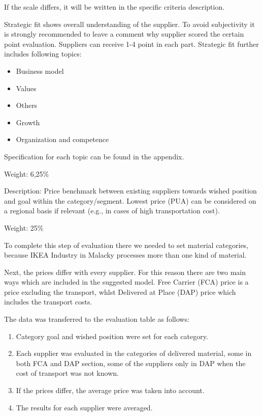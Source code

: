 \documentclass[oneside,12pt]{article}%
\begin{document}
If the scale differs, it will be written in the specific criteria description.

Strategic fit shows overall understanding of the supplier. To avoid subjectivity it is strongly recommended to leave a comment why supplier scored the certain point evaluation. Suppliers can receive 1-4 point in each part. Strategic fit further includes following topics:
\begin{itemize}
  \item Business model
  \item Values
  \item Others
  \item Growth
  \item Organization and competence
\end{itemize}

Specification for each topic can be found in the appendix. \par
\vspace{2mm}
\noindent Weight: 6,25\%



Description: Price benchmark between existing suppliers towards wished position and goal within the category/segment. Lowest price (PUA) can be considered on a regional basis if relevant (e.g., in cases of high transportation cost).

\vspace{2mm}
\noindent Weight: 25\%
\vspace{2mm}

To complete this step of evaluation there we needed to set material categories, because IKEA Industry in Malacky processes more than one kind of material. \par
Next, the prices differ with every supplier. For this reason there are two main ways which are included in the suggested model. Free Carrier (FCA) price is a price excluding the transport, whlst Delivered at Place (DAP) price which includes the transport costs. \par
The data was transferred to the evaluation table as follows:

\begin{enumerate}
  \item Category goal and wished position were set for each category.
  \item Each supplier was evaluated in the categories of delivered material, some in both FCA and DAP section, some of the suppliers only in DAP when the cost of transport was not known.
  \item If the prices differ, the average price was taken into account.
  \item The results for each supplier were averaged.
\end{enumerate}
\end{document}
